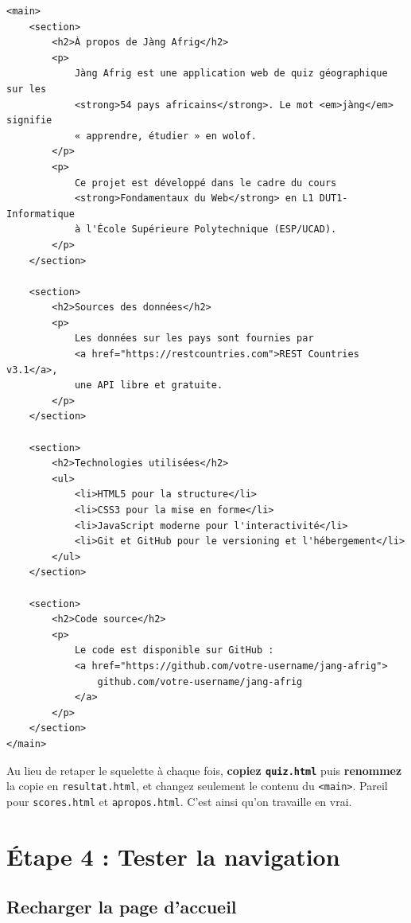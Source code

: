 \documentclass[11pt,a4paper]{article}
\begin{document}
\begin{lstlisting}[language=HTML5]
<main>
    <section>
        <h2>À propos de Jàng Afrig</h2>
        <p>
            Jàng Afrig est une application web de quiz géographique sur les
            <strong>54 pays africains</strong>. Le mot <em>jàng</em> signifie
            « apprendre, étudier » en wolof.
        </p>
        <p>
            Ce projet est développé dans le cadre du cours
            <strong>Fondamentaux du Web</strong> en L1 DUT1-Informatique
            à l'École Supérieure Polytechnique (ESP/UCAD).
        </p>
    </section>

    <section>
        <h2>Sources des données</h2>
        <p>
            Les données sur les pays sont fournies par
            <a href="https://restcountries.com">REST Countries v3.1</a>,
            une API libre et gratuite.
        </p>
    </section>

    <section>
        <h2>Technologies utilisées</h2>
        <ul>
            <li>HTML5 pour la structure</li>
            <li>CSS3 pour la mise en forme</li>
            <li>JavaScript moderne pour l'interactivité</li>
            <li>Git et GitHub pour le versioning et l'hébergement</li>
        </ul>
    </section>

    <section>
        <h2>Code source</h2>
        <p>
            Le code est disponible sur GitHub :
            <a href="https://github.com/votre-username/jang-afrig">
                github.com/votre-username/jang-afrig
            </a>
        </p>
    </section>
</main>
\end{lstlisting}

\begin{retenirbox}
Au lieu de retaper le squelette à chaque fois, \textbf{copiez \texttt{quiz.html}}
puis \textbf{renommez} la copie en \texttt{resultat.html}, et changez
seulement le contenu du \texttt{<main>}. Pareil pour \texttt{scores.html}
et \texttt{apropos.html}. C'est ainsi qu'on travaille en vrai.
\end{retenirbox}

\newpage

\section{Étape 4 : Tester la navigation}

\subsection{Recharger la page d'accueil}
\end{document}
